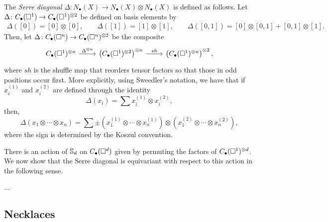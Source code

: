 The \textit{Serre diagonal} $\Delta \colon N_\bullet(X) \to N_\bullet(X) \otimes N_\bullet(X)$ is defined as follows. Let $\Delta \colon \chains(\square^1) \to \chains(\square^1)^{\otimes 2}$ be defined on basis elements by	
\begin{gather*}	
\Delta([0]) = [0] \otimes [0], \qquad 
\Delta([1]) = [1] \otimes [1], \qquad
\Delta([0, 1]) = [0] \otimes [0, 1] + [0, 1] \otimes [1].	
\end{gather*}	
Then, let
$\Delta \colon \chains(\square^n) \to \chains(\square^n)^{\otimes 2}$
be the composite
\begin{equation*}
\begin{tikzcd}
\chains(\square^1)^{\otimes n} \arrow[r, "\Delta^{\otimes n}"] & \left( \chains(\square^1)^{\otimes 2} \right)^{\otimes n} \arrow[r, "sh"] & \left( \chains(\square^1)^{\otimes n} \right)^{\otimes 2},
\end{tikzcd}
\end{equation*}
where $sh$ is the shuffle map that reorders tensor factors so that those in odd positions occur first. More explicitly, using Sweedler's notation, we have that if $x_i^{(1)}$ and $x_i^{(2)}$ are defined through the identity
\begin{equation*}	
\Delta(x_i) = \sum x_i^{(1)} \otimes x_i^{(2)},
\end{equation*}	
then,
\begin{equation} \label{E: Delta}	
\Delta (x_1 \otimes \cdots \otimes x_n) = 	
\sum \pm \left( x_1^{(1)} \otimes \cdots \otimes x_n^{(1)} \right) \otimes 	
\left( x_1^{(2)} \otimes \cdots \otimes x_n^{(2)} \right),
\end{equation}	
where the sign is determined by the Koszul convention.

There is an action of $\S_d$ on $\chains(\square^d)$ given by permuting the factors of $\chains(\square^1)^{\otimes d}$.
We now show that the Serre diagonal is equivariant with respect to this action in the following sense.

\begin{proposition} \label{p:serre diagonal invariant}
	...
\end{proposition}

\subsection{Necklaces}
